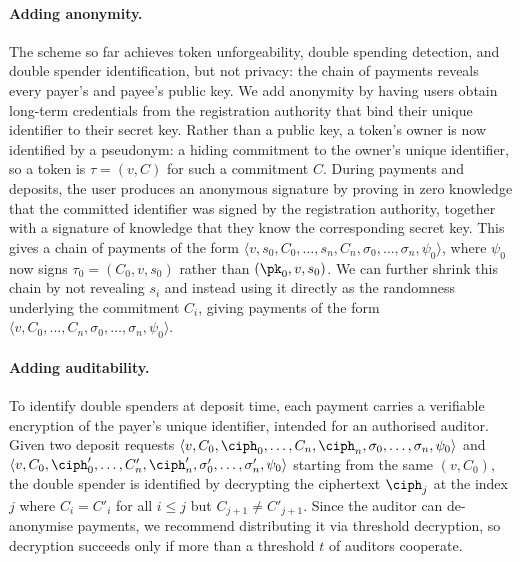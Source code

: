 \paragraph{Adding anonymity.} The scheme so far achieves token unforgeability,
double spending detection, and double spender identification, but not privacy:
the chain of payments reveals every payer's and payee's public key. We add
anonymity by having users obtain long-term credentials from the registration
authority that bind their unique identifier to their secret key. Rather than a
public key, a token's owner is now identified by a pseudonym: a hiding
commitment to the owner's unique identifier, so a token is $\tau = (v, C)$ for
such a commitment $C$. During payments and deposits, the user produces an
anonymous signature by proving in zero knowledge that the committed identifier
was signed by the registration authority, together with a signature of
knowledge that they know the corresponding secret key. This gives a chain of
payments of the form $\langle v, s_0, C_0, \ldots, s_n, C_n, \sigma_0, \ldots,
\sigma_n, \psi_0 \rangle$, where $\psi_0$ now signs $\tau_0 = (C_0, v, s_0)$
rather than $(\pk_0, v, s_0)$. We can further shrink this chain by not
revealing $s_i$ and instead using it directly as the randomness underlying the
commitment $C_i$, giving payments of the form $\langle v, C_0, \ldots, C_n,
\sigma_0, \ldots, \sigma_n, \psi_0 \rangle$.

\paragraph{Adding auditability.} To identify double spenders at deposit time,
each payment carries a verifiable encryption of the payer's unique identifier,
intended for an authorised auditor. Given two deposit requests $\langle v, C_0,
\ciph_0, \ldots, C_n, \ciph_n, \sigma_0, \ldots, \sigma_n, \psi_0 \rangle$ and
$\langle v, C_0, \ciph'_0, \ldots, C'_n, \ciph'_n, \sigma'_0, \ldots,
\sigma'_n, \psi_0 \rangle$ starting from the same $(v, C_0)$, the double
spender is identified by decrypting the ciphertext $\ciph_j$ at the index $j$
where $C_i = C'_i$ for all $i \leq j$ but $C_{j+1} \neq C'_{j+1}$. Since the
auditor can de-anonymise payments, we recommend distributing it via threshold
decryption, so decryption succeeds only if more than a threshold $t$ of
auditors cooperate.


